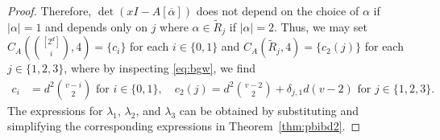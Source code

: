 \documentclass[11pt]{article}
\begin{document}
\begin{proof}
Therefore, $\det(xI-A[\overline \alpha])$ does not depend on the choice of $\alpha$ if $|\alpha|=1$ and depends only on $j$ where $\alpha\in\tilde{R}_j$ if $|\alpha|=2$. 
Thus, we may set $C_A \left (\binom{[2^d]}{i},4 \right ) = \{c_i\}$ for each $i \in \{0,1\}$ and $C_A \left (\tilde{R}_j,4 \right ) = \{c_2(j)\}$ for each $j \in \{1,2,3\}$, where 
by inspecting \eqref{eq:bgw}, we find
\begin{align*}
c_i&=d^2\binom{v-i}{2}\text{ 
for }i\in\{0,1\},\quad 
c_2(j)=d^2\binom{v-2}{2}+\delta_{j,1}d(v-2)\text{ 
for }j\in\{1,2,3\}. 
\end{align*}
The expressions for $\lambda_1$, $\lambda_2$, and $\lambda_3$ can be obtained by substituting and simplifying the corresponding expressions in Theorem~\ref{thm:pbibd2}. 
\end{proof}



\end{document}
